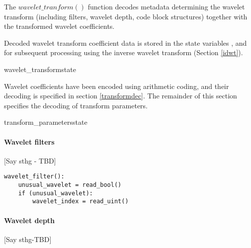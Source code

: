 {The $wavelet\_tranform()$ function decodes metadata determining the wavelet 
transform (including filters, wavelet depth, code block structures)
together with the transformed wavelet coefficients.

Decoded wavelet transform coefficient data is stored in the state
variables \YTransform, \UTransform and \VTransform for subsequent 
processing using the inverse wavelet transform (Section \ref{idwt}).

\begin{pseudo}{wavelet\_transform}{state}
\bsELSE
\bsEND

    \bsCODE{\ComponentWidth = \LumaWidth}
    \bsCODE{\ComponentHeight = \LumaHeight}

    \bsCODE{\ComponentWidth = \ChromaWidth}
    \bsCODE{\ComponentHeight = \ChromaHeight}
\end{pseudo}

Wavelet coefficients have been encoded using arithmetic coding, and their 
decoding is specified in section \ref{transformdec}. The remainder of this
section specifies the decoding of transform parameters.

\begin{pseudo}{transform\_parameters}{state}
\end{pseudo}

\paragraph{Wavelet filters\newline}
\label{wltfilter}
[Say sthg - TBD]
\begin{verbatim}
wavelet_filter():
    unusual_wavelet = read_bool()
    if (unusual_wavelet):
        wavelet_index = read_uint()
\end{verbatim}

\paragraph{Wavelet depth\newline}
\label{wltdepth}
[Say sthg-TBD]

}
